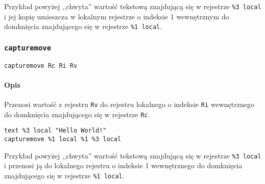 Przykład powyżej ,,chwyta'' wartość tekstową znajdującą się w rejestrze
\texttt{\%3~local} i jej kopię umieszcza w lokalnym rejestrze o indeksie 1
wewnętrznym do domknięcia znajdującego się w rejestrze \texttt{\%1~local}.

\subsubsection{\texttt{capturemove}}

\begin{lstlisting}
capturemove Rc Ri Rv
\end{lstlisting}

\paragraph*{Opis} Przenosi wartość z rejestru \texttt{Rv} do rejestru lokalnego
o indeksie \texttt{Ri} wewnętrznego do domknięcia znajdującego się w rejestrze
\texttt{Rc}.
\begin{lstlisting}
text %3 local "Hello World!"
capturemove %1 local %1 %3 local
\end{lstlisting}

Przykład powyżej ,,chwyta'' wartość tekstową znajdującą się w rejestrze
\texttt{\%3~local} i przenosi ją do lokalnego rejestru o indeksie 1
wewnętrznego do domknięcia znajdującego się w rejestrze \texttt{\%1~local}.
